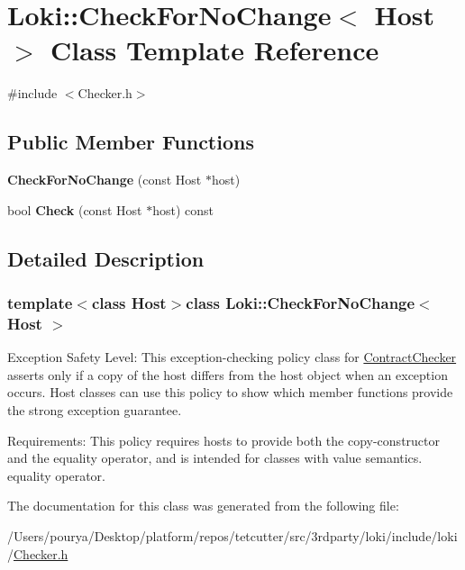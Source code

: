 \hypertarget{classLoki_1_1CheckForNoChange}{}\section{Loki\+:\+:Check\+For\+No\+Change$<$ Host $>$ Class Template Reference}
\label{classLoki_1_1CheckForNoChange}


{\ttfamily \#include $<$Checker.\+h$>$}

\subsection*{Public Member Functions}
\begin{DoxyCompactItemize}
\item 
\hypertarget{classLoki_1_1CheckForNoChange_af5921c801b4f4cb7c4ada3874aa9fbf5}{}{\bfseries Check\+For\+No\+Change} (const Host $\ast$host)\label{classLoki_1_1CheckForNoChange_af5921c801b4f4cb7c4ada3874aa9fbf5}

\item 
\hypertarget{classLoki_1_1CheckForNoChange_abfe7465ff5479e28bb302dea9a9fe388}{}bool {\bfseries Check} (const Host $\ast$host) const \label{classLoki_1_1CheckForNoChange_abfe7465ff5479e28bb302dea9a9fe388}

\end{DoxyCompactItemize}


\subsection{Detailed Description}
\subsubsection*{template$<$class Host$>$class Loki\+::\+Check\+For\+No\+Change$<$ Host $>$}

\begin{DoxyParagraph}{Exception Safety Level\+:}
This exception-\/checking policy class for \hyperlink{classLoki_1_1ContractChecker}{Contract\+Checker} asserts only if a copy of the host differs from the host object when an exception occurs. Host classes can use this policy to show which member functions provide the strong exception guarantee.
\end{DoxyParagraph}
\begin{DoxyParagraph}{Requirements\+:}
This policy requires hosts to provide both the copy-\/constructor and the equality operator, and is intended for classes with value semantics. equality operator. 
\end{DoxyParagraph}


The documentation for this class was generated from the following file\+:\begin{DoxyCompactItemize}
\item 
/\+Users/pourya/\+Desktop/platform/repos/tetcutter/src/3rdparty/loki/include/loki/\hyperlink{Checker_8h}{Checker.\+h}\end{DoxyCompactItemize}

